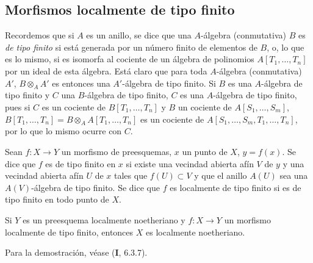 \subsection{Morfismos localmente de tipo finito}
\label{subsection:IV.1.3-fr}

\begin{env}[1.3.1]
\label{IV.1.3.1-fr}
Recordemos que si $A$ es un anillo, se dice que una $A$-álgebra (conmutativa) $B$ es
\emph{de tipo finito} si está generada por un número finito de elementos de
$B$, o, lo que es lo mismo, si es isomorfa al cociente de un
álgebra de polinomios $A[T_1,\ldots,T_n]$ por un ideal de esta álgebra. Está
claro que para toda $A$-álgebra (conmutativa) $A'$,
$B\otimes_AA'$ es entonces una $A'$-álgebra de tipo finito. Si $B$ es una
$A$-álgebra de tipo finito y $C$ una $B$-álgebra de tipo finito, $C$ es una
$A$-álgebra de tipo finito, pues si $C$ es un cociente de
$B[T_1,\ldots,T_n]$ y $B$ un cociente de $A[S_1,\ldots,S_m]$,
$B[T_1,\ldots,T_n]=B\otimes_AA[T_1,\ldots,T_n]$ es un cociente de
$A[S_1,\ldots,S_m,T_1,\ldots,T_n]$, por lo que lo mismo ocurre con $C$.
\end{env}

\begin{definition}[1.3.2]
\label{IV.1.3.2-fr}
Sean $f:X\to Y$ un morfismo de preesquemas, $x$ un punto de $X$,
$y=f(x)$. Se dice que $f$ es de tipo finito en $x$ si existe una
vecindad abierta afín $V$ de $y$ y una vecindad abierta afín $U$ de $x$
tales que $f(U)\subset V$ y que el anillo $A(U)$ sea una $A(V)$-álgebra de
tipo finito. Se dice que $f$ es localmente de tipo finito si es de tipo
finito en todo punto de $X$.
\end{definition}


\begin{proposition}[1.3.3]
\label{IV.1.3.3-fr}
Si $Y$ es un preesquema localmente noetheriano y $f:X\to Y$ un morfismo
localmente de tipo finito, entonces $X$ es localmente noetheriano.
\end{proposition}

Para la demostración, véase (\textbf{I}, 6.3.7).

